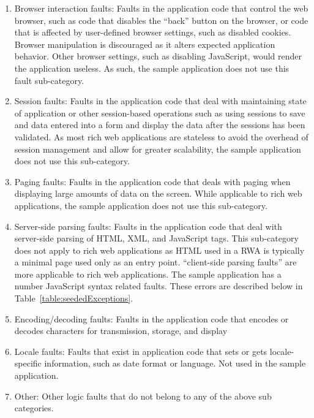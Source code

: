 \begin{enumerate}
\item Browser interaction faults: Faults in the application code that control the web browser, such as code that disables the ``back'' button on the browser, or code that is affected by user-defined browser settings, such as disabled cookies.  Browser manipulation is discouraged as it alters expected application behavior.  Other browser settings, such as disabling JavaScript, would render the application useless.  As such, the sample application does not use this fault sub-category.

\item Session faults: Faults in the application code that deal with maintaining state of application or other session-based operations such as using sessions to save and data entered into a form and display the data after the sessions has been validated.  As most rich web applications are stateless to avoid the overhead of session management and allow for greater scalability, the sample application does not use this sub-category.

\item Paging faults: Faults in the application code that deals with paging when displaying large amounts of data on the screen.  While applicable to rich web applications, the sample application does not use this sub-category.

\item Server-side parsing faults: Faults in the application code that deal with server-side parsing of HTML, XML, and JavaScript tags.  This sub-category does not apply to rich web applications as HTML used in a RWA is typically a minimal page used only as an entry point.  ``client-side parsing faults''  are more applicable to rich web applications.   The sample application has a number JavaScript syntax related faults.  These errors are described below in Table~\ref{table:seededExceptions}.

\item Encoding/decoding faults: Faults in the application code that encodes or decodes characters for transmission, storage, and display

\item Locale faults: Faults that exist in application code that sets or gets locale-specific information, such as date format or language.  Not used in the sample application.

\item Other: Other logic faults that do not belong to any of the above sub categories.
\end{enumerate}

